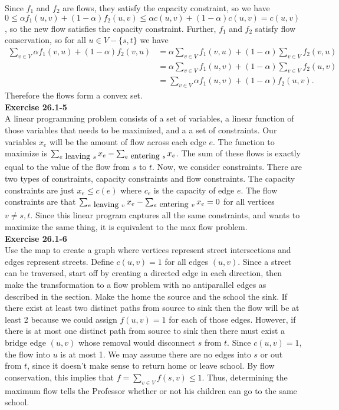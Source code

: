 \documentclass{article}
\begin{document}
Since $f_1$ and $f_2$ are flows, they satisfy the capacity constraint, so we have $0 \leq \alpha f_1(u,v) + (1-\alpha)f_2(u,v) \leq \alpha c(u,v) + (1-\alpha)c(u,v) = c(u,v)$, so the new flow satisfies the capacity constraint.  Further, $f_1$ and $f_2$ satisfy flow conservation, so for all $u \in V - \{s,t\}$ we have 
\begin{align*}
 \sum_{v \in V} \alpha f_1(v,u) + (1-\alpha)f_2(v,u) &= \alpha \sum_{v \in V} f_1(v,u) + (1-\alpha)\sum_{v \in V} f_2(v,u) \\
&= \alpha \sum_{v \in V} f_1(u,v) + (1-\alpha)\sum_{v \in V} f_2(u,v) \\
&= \sum_{v \in V} \alpha f_1(u,v) + (1-\alpha)f_2(u,v).
\end{align*}
Therefore the flows form a convex set. \\

\noindent\textbf{Exercise 26.1-5}\\

A linear programming problem consists of a set of variables, a linear function of those variables that needs to be maximized, and a a set of constraints. Our variables $x_e$ will be the amount of flow across each edge $e$. The function to maximize is $\sum_{e\hbox{ leaving }s} x_e - \sum_{e\hbox{ entering }s} x_e$. The sum of these flows is exactly equal to the value of the flow from $s$ to $t$. Now, we consider constraints. There are two types of constraints, capacity constraints and flow constraints. The capacity constraints are just $x_e \le c(e)$ where $c_e$ is the capacity of edge $e$. The flow constraints are that $\sum_{e\hbox{ leaving }v} x_e - \sum_{e\hbox{ entering }v} x_e = 0$ for all vertices $v\neq s,t$. Since this linear program captures all the same constraints, and wants to maximize the same thing, it is equivalent to the max flow problem.\\


\noindent\textbf{Exercise 26.1-6}\\

Use the map to create a graph where vertices represent street intersections and edges represent streets.  Define $c(u,v) = 1$ for all edges $(u,v)$.  Since a street can be traversed, start off by creating a directed edge in each direction, then make the transformation to a flow problem with no antiparallel edges as described in the section.  Make the home the source and the school the sink.  If there exist at least two distinct paths from source to sink then the flow will be at least 2 because we could assign $f(u,v) = 1$ for each of those edges.  However, if there is at most one distinct path from source to sink then there must exist a bridge edge $(u,v)$ whose removal would disconnect $s$ from $t$.  Since $c(u,v) = 1$, the flow into $u$ is at most 1.  We may assume there are no edges into $s$ or out from $t$, since it doesn't make sense to return home or leave school.  By flow conservation, this implies that $f = \sum_{v \in V} f(s,v) \leq 1$.  Thus, determining the maximum flow tells the Professor whether or not his children can go to the same school. \\
\end{document}
